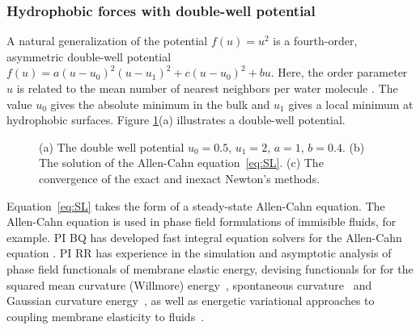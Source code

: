 

\subsubsection{Hydrophobic forces with double-well potential}
A natural generalization of the potential $f(u) = u^2$
is a fourth-order, asymmetric double-well potential
$f(u) = a(u-u_0)^2(u-u_1)^2 + c(u-u_0)^2 + bu$.
Here, the order parameter $u$ is related to
the mean number of nearest neighbors
per water molecule \cite{GoHaKo94}.
The value $u_0$ gives the absolute minimum in the bulk
and $u_1$ gives a local minimum at hydrophobic surfaces.
Figure \ref{fig:CA}(a) illustrates a double-well potential.


\begin{figure}
  \vspace{-4pt}
  \centering
   
  \caption{\label{fig:CA} (a) The double well potential $u_0 =
  0.5$, $u_1 = 2$, $a = 1$, $b = 0.4$. (b) The solution of the
  Allen-Cahn equation~\eqref{eq:SL}. (c) The convergence of the exact
  and inexact Newton's methods.}
\end{figure}
Equation~\eqref{eq:SL} takes the form of a steady-state Allen-Cahn
equation. The Allen-Cahn equation is used in phase field formulations of
immisible fluids, for example.
PI BQ has developed fast integral equation solvers for
the Allen-Cahn equation \cite{kro-qua2011, qua2011}.
PI RR has experience in the 
simulation and asymptotic analysis of phase field functionals of
membrane elastic energy, devising functionals for for the squared mean
curvature (Willmore) energy~\cite{0951-7715-18-3-016}, spontaneous
curvature~\cite{Du05} and Gaussian curvature energy~\cite{DuEuler}, as
well as energetic variational approaches to coupling membrane elasticity
to fluids~\cite{QiangDu09}.

